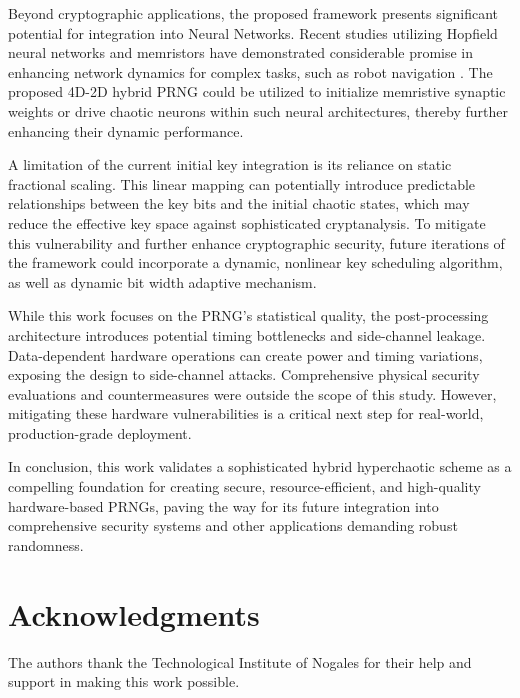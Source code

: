 \documentclass[preprint, 12pt, sort&compress]{elsarticle}
\begin{document}
{\color{red}
Beyond cryptographic applications, the proposed framework presents significant potential for integration into Neural Networks. Recent studies utilizing Hopfield neural networks and memristors have demonstrated considerable promise in enhancing network dynamics for complex tasks, such as robot navigation \cite{lai_universal_2025}. The proposed 4D-2D hybrid PRNG could be utilized to initialize memristive synaptic weights or drive chaotic neurons within such neural architectures, thereby further enhancing their dynamic performance.

A limitation of the current initial key integration is its reliance on static fractional scaling. This linear mapping can potentially introduce predictable relationships between the key bits and the initial chaotic states, which may reduce the effective key space against sophisticated cryptanalysis. To mitigate this vulnerability and further enhance cryptographic security, future iterations of the framework could incorporate a dynamic, nonlinear key scheduling algorithm, as well as dynamic bit width adaptive mechanism.

While this work focuses on the PRNG's statistical quality, the post-processing architecture introduces potential timing bottlenecks and side-channel leakage. Data-dependent hardware operations can create power and timing variations, exposing the design to side-channel attacks. Comprehensive physical security evaluations and countermeasures were outside the scope of this study. However, mitigating these hardware vulnerabilities is a critical next step for real-world, production-grade deployment.
}


In conclusion, this work validates a sophisticated hybrid hyperchaotic scheme as a compelling foundation for creating secure, resource-efficient, and high-quality hardware-based PRNGs, paving the way for its future integration into comprehensive security systems and other applications demanding robust randomness.

\section*{Acknowledgments}
The authors thank the Technological Institute of Nogales for their help and support in making this work possible.
\end{document}

